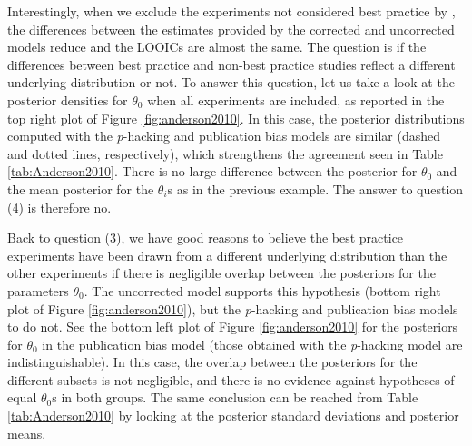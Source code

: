 \documentclass[useAMS,usenatbib,referee]{biom}
\begin{document}
Interestingly, when we exclude the experiments not considered best practice by \citet{anderson2010violent}, the differences between the estimates provided by the corrected and uncorrected models reduce and the LOOICs are almost the same. The question is if the differences between best practice and non-best practice studies reflect a different underlying distribution or not. To answer this question, let us take a look at the posterior densities for $\theta_{0}$ when all experiments are included, as reported in the top right plot of Figure \ref{fig:anderson2010}. In this case, the posterior distributions computed with the \textit{p}-hacking and publication bias models are similar (dashed and dotted lines, respectively), which strengthens the agreement seen in Table \ref{tab:Anderson2010}. There is no large difference between the posterior for $\theta_{0}$ and the mean posterior for the $\theta_{i}$s as in the previous example. The answer to question (4) is therefore no.

Back to question (3), we have good reasons to believe the best practice experiments have been drawn from a different underlying distribution than the other experiments if there is negligible overlap between the posteriors for the parameters $\theta_{0}$. The uncorrected model supports this hypothesis (bottom right plot of Figure \ref{fig:anderson2010}), but the \textit{p}-hacking and publication bias models to do not. See the bottom left plot of Figure \ref{fig:anderson2010} for the posteriors for $\theta_0$ in the publication bias model (those obtained with the \textit{p}-hacking model are indistinguishable). In this case, the overlap between the posteriors for the different subsets is not negligible, and there is no evidence against hypotheses of equal $\theta_0$s in both groups. The same conclusion can be reached from Table \ref{tab:Anderson2010} by looking at the posterior standard deviations and posterior means.
\end{document}
